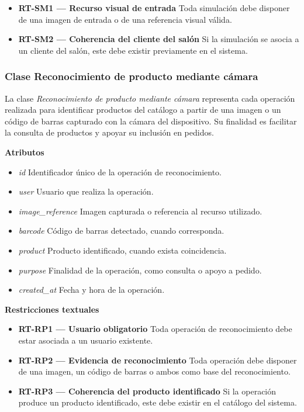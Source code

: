\begin{itemize}

      \item \textbf{RT-SM1 — Recurso visual de entrada}
            Toda simulación debe disponer de una imagen de entrada o de una referencia visual válida.
      \item \textbf{RT-SM2 — Coherencia del cliente del salón}
            Si la simulación se asocia a un cliente del salón, este debe existir previamente en el sistema.

\end{itemize}

\subsubsection{Clase Reconocimiento de producto mediante cámara}

La clase \textit{Reconocimiento de producto mediante cámara} representa cada operación realizada para identificar productos del catálogo a partir de una imagen o un código de barras capturado con la cámara del dispositivo. Su finalidad es facilitar la consulta de productos y apoyar su inclusión en pedidos.

\textbf{Atributos}

\begin{itemize}

      \item \textit{id}
            Identificador único de la operación de reconocimiento.
      \item \textit{user}
            Usuario que realiza la operación.
      \item \textit{image\_reference}
            Imagen capturada o referencia al recurso utilizado.
      \item \textit{barcode}
            Código de barras detectado, cuando corresponda.
      \item \textit{product}
            Producto identificado, cuando exista coincidencia.
      \item \textit{purpose}
            Finalidad de la operación, como consulta o apoyo a pedido.
      \item \textit{created\_at}
            Fecha y hora de la operación.

\end{itemize}

\textbf{Restricciones textuales}

\begin{itemize}

      \item \textbf{RT-RP1 — Usuario obligatorio}
            Toda operación de reconocimiento debe estar asociada a un usuario existente.
      \item \textbf{RT-RP2 — Evidencia de reconocimiento}
            Toda operación debe disponer de una imagen, un código de barras o ambos como base del reconocimiento.
      \item \textbf{RT-RP3 — Coherencia del producto identificado}
            Si la operación produce un producto identificado, este debe existir en el catálogo del sistema.

\end{itemize}


